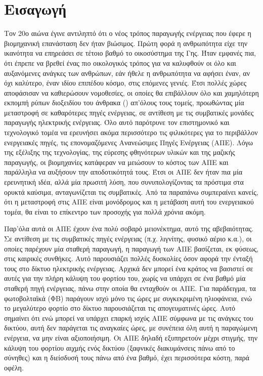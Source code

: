 \documentclass[12pt]{report}
\begin{document}
\chapter*{Εισαγωγή}
Τον 20ο αιώνα έγινε αντιληπτό ότι ο νέος τρόπος παραγωγής ενέργειας που έφερε η βιομηχανική επανάσταση δεν ήταν βιώσιμος. Πρώτη φορά η ανθρωπότητα είχε την ικανότητα να επηρεάσει σε τέτοιο βαθμό το οικοσύστημα της Γης. Ήταν εμφανές 
πια, ότι έπρεπε να βρεθεί ένας πιο οικολογικός τρόπος για να καλυφθούν οι όλο και αυξανόμενες ανάγκες των ανθρώπων, εάν ήθελε η ανθρωπότητα να αφήσει έναν, αν όχι καλύτερο, έναν ιδίου επιπέδου κόσμο, στις επόμενες γενιές. Έτσι πολλές
χώρες αποφάσισαν να καθιερώσουν νομοθεσίες, οι οποίες θα επιβάλλουν όλο και χαμηλότερη εκπομπή ρύπων διοξειδίου του άνθρακα ({}) απ'όλους τους τομείς, προωθώντας μία μεταστροφή σε καθαρότερες πηγές ενέργειας, σε 
αντίθεση με τις συμβατικές μονάδες παραγωγής ηλεκτρικής ενέργειας. Όλο αυτό παρότρυνε τον επιστημονικό και τεχνολογικό τομέα να ερευνήσει ακόμα περισσότερο τις φιλικότερες για το περιβάλλον ενεργειακές πηγές, τις επονομαζόμενες 
Ανανεώσιμες Πηγές Ενέργειας (ΑΠΕ). Λόγω της εξέλιξης της τεχνολογίας, της εύρεσης φθηνότερων υλικών και της μαζικής παραγωγής, οι βιομηχανίες κατάφεραν να μειώσουν το κόστος των ΑΠΕ και παράλληλα να αυξήσουν την αποδοτικότητά τους.
Έτσι οι ΑΠΕ δεν ήταν πια μία ερευνητική ιδέα, αλλά μία πρωσιτή λύση, που συνυπολογίζοντας τα πρόστιμα στα ορυκτά καύσιμα, ανταγωνίζεται τις συμβατικές. Από τα παραπάνω συμπεραίνει κανείς, ότι η μεταστροφή στις ΑΠΕ είναι μονόδρομος και
η μετάβαση αυτή του ενεργειακού τομέα, θα είναι το επίκεντρο των προσοχής για πολλά χρόνια ακόμη.

Παρ'όλα αυτά οι ΑΠΕ έχουν ένα πολύ σοβαρό μειονέκτημα, αυτό της αβεβαιότητας. Σε αντίθεση με τις συμβατικές πηγές ενέργειας (π.χ. λιγνίτης, φυσικό αέριο κ.α.), οι οποίες παρέχουν μία σταθερή παραγωγή, η παραγωγή των ΑΠΕ βασίζεται, 
εκ φύσεως, στις καιρικές συνθήκες. Αυτό παρουσιάζει πολλές δυσκολίες όσον αφορά την ένταξή τους στο δίκτυο ηλεκτρικής ενέργειας. Αρχικά δεν μπορεί ένα κράτος να βασιστεί σε αυτές για την πλήρη κάλυψη του φορτίου του, χωρίς να υπάρχει
σε ένα βαθμό μία σταθερή πηγή ενέργειας, πάνω στην οποία θα ενταχθούν οι ΑΠΕ. Για παράδειγμα, τα φωτοβολταϊκά (ΦΒ) παράγουν ισχύ μόνο τις ώρες με συγκεκριμένη ηλιοφάνεια, ενώ το μεγαλύτερο φορτίο στο δίκτυο παρουσιάζεται τις
απογευματινές ώρες. Αυτό σημαίνει ότι ενώ μπορεί να υπάρχει επαρκή ισχύς ΑΠΕ σύμφωνα με τις ανάγκες του δικτύου, αυτή δεν παράγεται τις αναγκαίες ώρες, με συνέπεια όλη αυτή η παραγώμενη ενέργεια, να μην είναι αξιοποιήσιμη. Οι ΑΠΕ 
δηλαδή εξυπηρετούν μέχρι στιγμής, την κάλυψη του φορτίου αιχμής ενός δικτύου (ξαφνικές διακυμάνσεις πάνω από το σύνηθες) και η διείσδυσή τους πάνω από ένα βαθμό, έχει περισσότερα κόστη, παρά οφέλη. 
\end{document}
